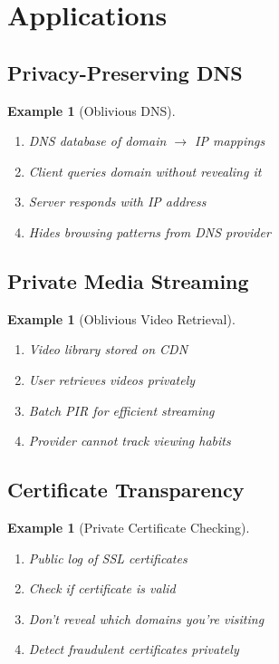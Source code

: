 \documentclass[11pt,final,hidelinks]{article}
\newtheorem{example}[theorem]{Example}
\begin{document}
\section{Applications}

\subsection{Privacy-Preserving DNS}

\begin{example}[Oblivious DNS]
\begin{enumerate}
    \item DNS database of domain $\to$ IP mappings
    \item Client queries domain without revealing it
    \item Server responds with IP address
    \item Hides browsing patterns from DNS provider
\end{enumerate}
\end{example}

\subsection{Private Media Streaming}

\begin{example}[Oblivious Video Retrieval]
\begin{enumerate}
    \item Video library stored on CDN
    \item User retrieves videos privately
    \item Batch PIR for efficient streaming
    \item Provider cannot track viewing habits
\end{enumerate}
\end{example}

\subsection{Certificate Transparency}

\begin{example}[Private Certificate Checking]
\begin{enumerate}
    \item Public log of SSL certificates
    \item Check if certificate is valid
    \item Don't reveal which domains you're visiting
    \item Detect fraudulent certificates privately
\end{enumerate}
\end{example}
\end{document}
